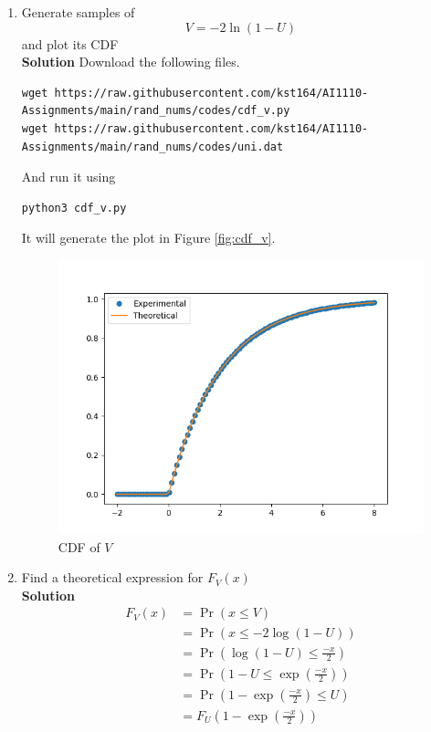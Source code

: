 \documentclass[journal, 12pt, twocolumn]{IEEEtran}
\providecommand{\pr}[1]{\ensuremath{\Pr\left(#1\right)}}
\begin{document}
\begin{enumerate}[label=\arabic{section}.\arabic*]
    \item
        Generate samples of
        \begin{equation}
            V = -2 \ln(1 - U)
        \end{equation}
        and plot its CDF
        \\
        \textbf{Solution} Download the following files.
        \begin{lstlisting}
wget https://raw.githubusercontent.com/kst164/AI1110-Assignments/main/rand_nums/codes/cdf_v.py
wget https://raw.githubusercontent.com/kst164/AI1110-Assignments/main/rand_nums/codes/uni.dat
        \end{lstlisting}
        And run it using
        \begin{lstlisting}
python3 cdf_v.py
        \end{lstlisting}
        It will generate the plot in Figure \eqref{fig:cdf_v}.
        \begin{figure}[!ht]
            \includegraphics[width=\columnwidth]{figs/cdf_v.png}
            \caption{CDF of $V$}
            \label{fig:cdf_v}
        \end{figure}

    \item
        Find a theoretical expression for $F_V(x)$
        \\
        \textbf{Solution}
        \begin{align}
            F_V(x) &= \pr{x \leq V} \\
            &= \pr{x \leq -2 \log (1 - U)} \\
            &= \pr{\log (1 - U) \leq \frac{-x}{2}} \\
            &= \pr{1 - U \leq \exp \left(\frac{-x}{2}\right)} \\
            &= \pr{1 - \exp \left(\frac{-x}{2}\right) \leq U} \\
            &= F_U \left(1 - \exp \left(\frac{-x}{2}\right)\right)
        \end{align}


\end{enumerate}
\end{document}
